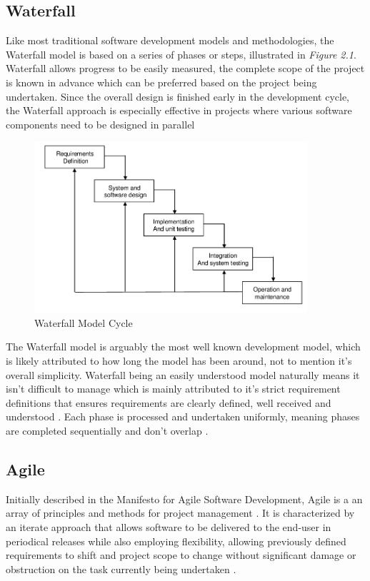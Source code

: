 \subsection{Waterfall}
Like most traditional software development models and methodologies, the Waterfall model is based on a series of phases or steps, illustrated in \textit{Figure 2.1}. Waterfall allows progress to be easily measured, the complete scope of the project is known in advance which can be preferred based on the project being undertaken. Since the overall design is finished early in the development cycle, the Waterfall approach is especially effective in projects where various software components need to be designed in parallel \cite{WATERFALL_SURVEY} 

\begin{figure}[H]
	\caption{Waterfall Model Cycle}
	\label{image:myImageName}
	\centering
	\includegraphics[width=0.9\textwidth]{images/waterfall.png}
\end{figure}	

The Waterfall model is arguably the most well known development model, which is likely attributed to how long the model has been around, not to mention it's overall simplicity. Waterfall being an easily understood model naturally means it isn't difficult to manage which is mainly attributed to it's strict requirement definitions that ensures requirements are clearly defined, well received and understood \cite{WATERFALL}. Each phase is processed and undertaken uniformly, meaning phases are completed sequentially and don't overlap \cite{WATERFALL_REVIEW}.

\subsection{Agile}
Initially described in the Manifesto for Agile Software Development, Agile is a an array of principles and methods for project management \cite{AGILE_MANIFESTO}. It is characterized by an iterate approach that allows software to be delivered to the end-user in periodical releases while also employing flexibility, allowing previously defined requirements to shift and project scope to change without significant damage or obstruction on the task currently being undertaken \cite{AGILE}.

